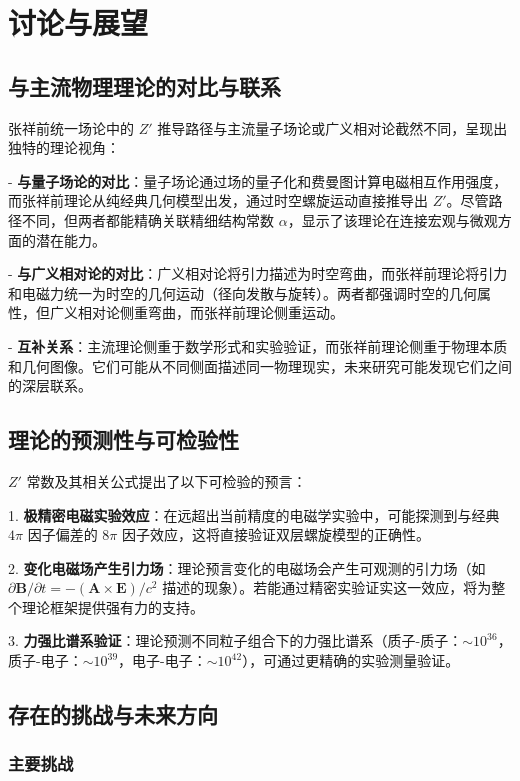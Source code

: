 \documentclass[a4paper,12pt]{article}
\theoremstyle{plain}
\renewcommand{\vec}[1]{\bm{#1}}
\begin{document}
\section{讨论与展望}

\subsection{与主流物理理论的对比与联系}

张祥前统一场论中的 $Z'$ 推导路径与主流量子场论或广义相对论截然不同，呈现出独特的理论视角：

- \textbf{与量子场论的对比}：量子场论通过场的量子化和费曼图计算电磁相互作用强度，而张祥前理论从纯经典几何模型出发，通过时空螺旋运动直接推导出 $Z'$。尽管路径不同，但两者都能精确关联精细结构常数 $\alpha$，显示了该理论在连接宏观与微观方面的潜在能力。

- \textbf{与广义相对论的对比}：广义相对论将引力描述为时空弯曲，而张祥前理论将引力和电磁力统一为时空的几何运动（径向发散与旋转）。两者都强调时空的几何属性，但广义相对论侧重弯曲，而张祥前理论侧重运动。

- \textbf{互补关系}：主流理论侧重于数学形式和实验验证，而张祥前理论侧重于物理本质和几何图像。它们可能从不同侧面描述同一物理现实，未来研究可能发现它们之间的深层联系。

\subsection{理论的预测性与可检验性}

$Z'$ 常数及其相关公式提出了以下可检验的预言：

1. \textbf{极精密电磁实验效应}：在远超出当前精度的电磁学实验中，可能探测到与经典 $4\pi$ 因子偏差的 $8\pi$ 因子效应，这将直接验证双层螺旋模型的正确性。

2. \textbf{变化电磁场产生引力场}：理论预言变化的电磁场会产生可观测的引力场（如 $\partial\vec{B}/\partial t = - (\vec{A} \times \vec{E})/c^2$ 描述的现象）。若能通过精密实验证实这一效应，将为整个理论框架提供强有力的支持。

3. \textbf{力强比谱系验证}：理论预测不同粒子组合下的力强比谱系（质子-质子：$\sim10^{36}$，质子-电子：$\sim10^{39}$，电子-电子：$\sim10^{42}$），可通过更精确的实验测量验证。

\subsection{存在的挑战与未来方向}

\subsubsection{主要挑战}
\end{document}
